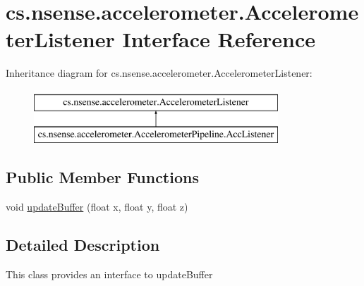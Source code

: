 \hypertarget{interfacecs_1_1nsense_1_1accelerometer_1_1_accelerometer_listener}{\section{cs.\-nsense.\-accelerometer.\-Accelerometer\-Listener Interface Reference}
\label{interfacecs_1_1nsense_1_1accelerometer_1_1_accelerometer_listener}
}
Inheritance diagram for cs.\-nsense.\-accelerometer.\-Accelerometer\-Listener\-:\begin{figure}[H]
\begin{center}
\leavevmode
\includegraphics[height=2.000000cm]{interfacecs_1_1nsense_1_1accelerometer_1_1_accelerometer_listener}
\end{center}
\end{figure}
\subsection*{Public Member Functions}
\begin{DoxyCompactItemize}
\item 
void \hyperlink{interfacecs_1_1nsense_1_1accelerometer_1_1_accelerometer_listener_a52f610202485456b046ff95cffbb72e4}{update\-Buffer} (float x, float y, float z)
\end{DoxyCompactItemize}


\subsection{Detailed Description}
This class provides an interface to update\-Buffer 

